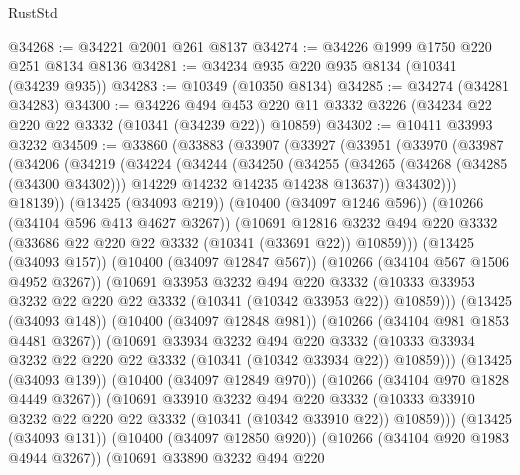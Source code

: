 \begin{lexlean}{RustStd}
\begin{coremodule}
{\begin{coremodule}
{{{{{{{{{{{{{{{{{{{{{{{{{@34268 := @34221 @2001 @261 @8137
@34274 := @34226 @1999 @1750 @220 @251 @8134 @8136
@34281 := @34234 @935 @220 @935 @8134 (@10341 (@34239 @935))
@34283 := @10349 (@10350 @8134)
@34285 := @34274 (@34281 @34283)
@34300 := @34226
    @494
    @453
    @220
    @11
    @3332
    @3226
    (@34234 @22 @220 @22 @3332 (@10341 (@34239 @22)) @10859)
@34302 := @10411 @33993 @3232
@34509 := @33860
    (@33883
      (@33907
        (@33927
          (@33951
            (@33970
              (@33987
                (@34206
                  (@34219
                    (@34224
                      (@34244
                        (@34250
                          (@34255
                            (@34265
                              (@34268 (@34285 (@34300 @34302)))
                              @14229
                              @14232
                              @14235
                              @14238
                              @13637))
                          @34302)))
                    @18139))
                (@13425 (@34093 @219))
                (@10400 (@34097 @1246 @596))
                (@10266 (@34104 @596 @413 @4627 @3267))
                (@10691
                  @12816
                  @3232
                  @494
                  @220
                  @3332
                  (@33686 @22 @220 @22 @3332 (@10341 (@33691 @22)) @10859)))
              (@13425 (@34093 @157))
              (@10400 (@34097 @12847 @567))
              (@10266 (@34104 @567 @1506 @4952 @3267))
              (@10691
                @33953
                @3232
                @494
                @220
                @3332
                (@10333 @33953 @3232 @22 @220 @22 @3332 (@10341 (@10342 @33953 @22)) @10859)))
            (@13425 (@34093 @148))
            (@10400 (@34097 @12848 @981))
            (@10266 (@34104 @981 @1853 @4481 @3267))
            (@10691
              @33934
              @3232
              @494
              @220
              @3332
              (@10333 @33934 @3232 @22 @220 @22 @3332 (@10341 (@10342 @33934 @22)) @10859)))
          (@13425 (@34093 @139))
          (@10400 (@34097 @12849 @970))
          (@10266 (@34104 @970 @1828 @4449 @3267))
          (@10691
            @33910
            @3232
            @494
            @220
            @3332
            (@10333 @33910 @3232 @22 @220 @22 @3332 (@10341 (@10342 @33910 @22)) @10859)))
        (@13425 (@34093 @131))
        (@10400 (@34097 @12850 @920))
        (@10266 (@34104 @920 @1983 @4944 @3267))
        (@10691
          @33890
          @3232
          @494
          @220
}}}}}}}}}}}}}}}}}}}}}}}}}
\end{coremodule}}
\end{coremodule}
\end{lexlean}
